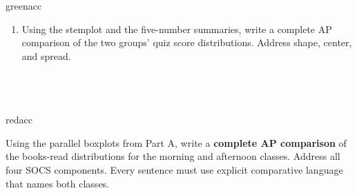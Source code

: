 \documentclass[10pt]{article}
\begin{document}
\begin{blurbbox}{greenacc}
\begin{enumerate}[leftmargin=1.5em, itemsep=8pt]
  \item Using the stemplot and the five-number summaries, write a complete
        AP comparison of the two groups' quiz score distributions.
        Address shape, center, and spread.\\[5pt]
        \writeline\\[1pt]\writeline\\[1pt]\writeline\\[1pt]\writeline

\end{enumerate}

\end{blurbbox}

\vspace{0.12in}

\begin{blurbbox}{redacc}
\small

Using the parallel boxplots from Part A, write a \textbf{complete AP comparison}
of the books-read distributions for the morning and afternoon classes. Address
all four SOCS components. Every sentence must use explicit comparative language
that names both classes.

\vspace{0.08in}
\writeline\\[1pt]\writeline\\[1pt]\writeline\\[1pt]
\writeline\\[1pt]\writeline\\[1pt]\writeline

\end{blurbbox}
\end{document}
